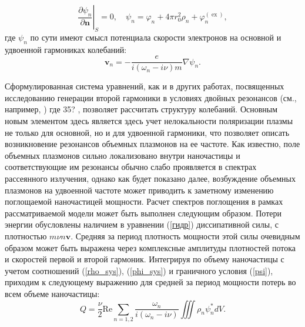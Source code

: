 \documentclass[12pt, a4paper]{article}
\renewcommand{\vec}{\mathbf}
\def \w {\omega}
\def \ph {\varphi}
\def \ex { \operatorname{ex}}
\newcommand{\rd}[1]{\color{red} #1 \color{black}}
\newcommand{\dn}[1]{\left.\frac{\partial #1}{\partial \vec{n}}\right|_{ S}}
\begin{document}
\begin{equation} 
	\label{psi}
\dn{\psi_n}	= 0, \quad \psi_n = \ph_n + 4 \pi r_0^2 \rho_n + \ph^{(\ex)}_n, 
\end{equation}
где $\psi_{n}$ по сути имеют смысл потенциала скорости электронов на основной и удвоенной гармониках колебаний:
\begin{equation} 
	\label{v}
	\vec{v}_n = -\frac{e}{i(\w_n - i\nu)m} \nabla \psi_n.
\end{equation}

Сформулированная система уравнений, как и в других работах, посвященных исследованию генерации второй гармоники в условиях двойных резонансов (см., например, \cite{Ai2021, Panoiu2018, Beer2022}) \rd{где 35?}, позволяет рассчитать структуру колебаний. Основным новым элементом здесь является здесь учет нелокальности поляризации плазмы не только для основной, но и для удвоенной гармоники, что позволяет описать возникновение резонансов объемных плазмонов на ее частоте. Как известно, поле объемных плазмонов сильно локализовано внутри наночастицы и соответствующие им резонансы обычно слабо проявляется в спектрах рассеянного излучения, однако как будет показано далее, возбуждение объемных плазмонов на удвоенной частоте может приводить к заметному изменению поглощаемой наночастицей мощности. Расчет спектров поглощения в рамках рассматриваемой модели может быть выполнен следующим образом. Потери энергии обусловлены наличием в уравнении (\ref{гидр}) диссипативной силы, с плотностью $m \nu n \vec{v}$. Средняя за период плотность мощности этой силы очевидным образом может быть выражена через комплексные амплитуды плотностей потока и скоростей первой и второй гармоник. Интегрируя по объему наночастицы с учетом соотношений (\ref{rho_sys}), (\ref{phi_sys}) и граничного условия (\ref{psi}), приходим к следующему выражению для средней за период мощности потерь во всем объеме наночастицы: 
\begin{equation} 
	\label{Q}
	Q = \frac{\nu}{2}\mathrm{Re}  \sum_{n=1,2}\frac{\w_n}{i(\w_n - i \nu)}\iiint\rho_n \psi_n^* dV.
\end{equation}
\end{document}
